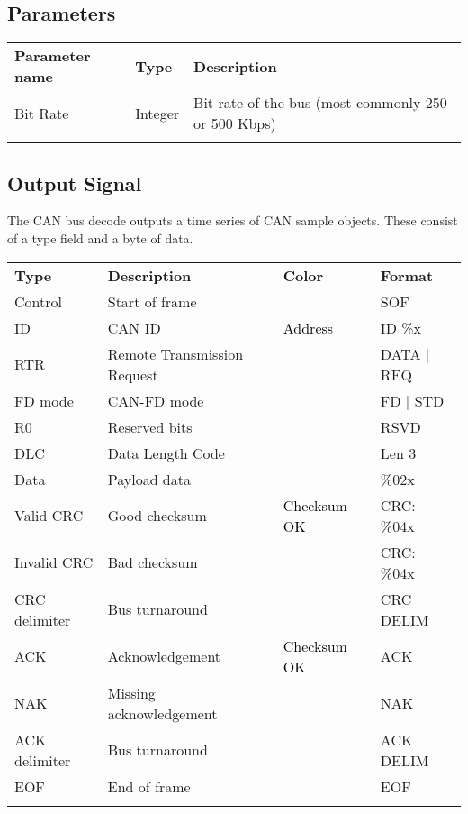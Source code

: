 \subsection{Parameters}

\begin{tabularx}{16cm}{llX}
\thickhline
\textbf{Parameter name} & \textbf{Type} & \textbf{Description} \\
\thickhline
Bit Rate & Integer & Bit rate of the bus (most commonly 250 or 500 Kbps)\\
\thickhline
\end{tabularx}

\subsection{Output Signal}

The CAN bus decode outputs a time series of CAN sample objects. These consist of a type field and a byte of data.

\begin{tabularx}{16cm}{lllX}
\thickhline
\textbf{Type} & \textbf{Description} & \textbf{Color} & \textbf{Format} \\
\thickhline
Control & Start of frame & \cellcolor{preamble}\textcolor{white}{Preamble} & SOF \\
\thinhline
ID & CAN ID & \cellcolor{address}\textcolor{black}{Address} & ID \%x \\
\thinhline
RTR & Remote Transmission Request & \cellcolor{control}\textcolor{white}{Control} & DATA | REQ \\
\thinhline
FD mode & CAN-FD mode & \cellcolor{control}\textcolor{white}{Control} & FD | STD\\
\thinhline
R0 & Reserved bits & \cellcolor{preamble}\textcolor{white}{Preamble} & RSVD \\
\thinhline
DLC & Data Length Code & \cellcolor{control}\textcolor{white}{Control} & Len 3 \\
\thinhline
Data & Payload data & \cellcolor{data}\textcolor{white}{Data} & \%02x \\
\thinhline
Valid CRC & Good checksum & \cellcolor{checksumok}\textcolor{black}{Checksum OK} & CRC: \%04x \\
\thinhline
Invalid CRC & Bad checksum & \cellcolor{checksumbad}\textcolor{white}{Checksum Bad} & CRC: \%04x \\
\thinhline
CRC delimiter & Bus turnaround & \cellcolor{preamble}\textcolor{white}{Preamble} & CRC DELIM \\
\thinhline
ACK & Acknowledgement & \cellcolor{checksumok}\textcolor{black}{Checksum OK} & ACK \\
\thinhline
NAK & Missing acknowledgement & \cellcolor{checksumbad}\textcolor{white}{Checksum Bad} & NAK \\
\thinhline
ACK delimiter & Bus turnaround & \cellcolor{preamble}\textcolor{white}{Preamble} & ACK DELIM \\
\thinhline
EOF & End of frame & \cellcolor{preamble}\textcolor{white}{Preamble} & EOF \\

\thickhline
\end{tabularx}

